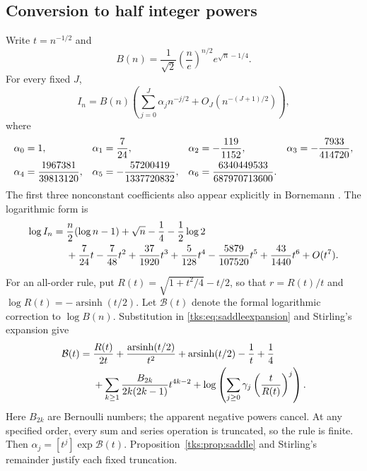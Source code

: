 \subsection{Conversion to half integer powers}
Write $t=n^{-1/2}$ and
\begin{equation}\label{tks:eq:Bofn}
B(n)=\frac1{\sqrt2}\left(\frac ne\right)^{n/2}e^{\sqrt n-1/4}.
\end{equation}
For every fixed $J$,
\begin{equation}\label{tks:eq:Ialpha}
I_n=B(n)\left(\sum_{j=0}^{J}\alpha_jn^{-j/2}
                  +O_J(n^{-(J+1)/2})\right),
\end{equation}
where
\begin{align}
\alpha_0&=1,&\alpha_1&=\frac7{24},&
\alpha_2&=-\frac{119}{1152},&
\alpha_3&=-\frac{7933}{414720},\notag\\
\alpha_4&=\frac{1967381}{39813120},&
\alpha_5&=-\frac{57200419}{1337720832},&
\alpha_6&=\frac{6340449533}{687970713600}.\label{tks:eq:alphas}
\end{align}
The first three nonconstant coefficients also appear explicitly in Bornemann \cite[Appendix C, (120)]{Bornemann}. The logarithmic form is
\begin{align}
\log I_n={}&\frac n2(\log n-1)+\sqrt n-\frac14-\frac12\log2\notag\\
 &+\frac7{24}t-\frac7{48}t^2+\frac{37}{1920}t^3
   +\frac5{128}t^4-\frac{5879}{107520}t^5
   +\frac{43}{1440}t^6+O(t^7).\label{tks:eq:logI}
\end{align}

For an all-order rule, put
$R(t)=\sqrt{1+t^2/4}-t/2$, so that $r=R(t)/t$ and $\log R(t)=-\operatorname{arsinh}(t/2)$. Let $\mathcal B(t)$ denote the formal logarithmic correction to $\log B(n)$. Substitution in \eqref{tks:eq:saddleexpansion} and Stirling's expansion give
\begin{align}
\mathcal B(t)={}&\frac{R(t)}{2t}
 +\frac{\operatorname{arsinh}(t/2)}{t^2}
 +\operatorname{arsinh}(t/2)-\frac1t+\frac14\notag\\
 &+\sum_{k\geq1}\frac{B_{2k}}{2k(2k-1)}t^{4k-2}
 +\log\left(\sum_{j\geq0}\gamma_j\left(\frac{t}{R(t)}\right)^j\right).
 \label{tks:eq:allorderI}
\end{align}
Here $B_{2k}$ are Bernoulli numbers; the apparent negative powers cancel. At any specified order, every sum and series operation is truncated, so the rule is finite. Then $\alpha_j=[t^j]\exp\mathcal B(t)$. Proposition~\ref{tks:prop:saddle} and Stirling's remainder justify each fixed truncation.

